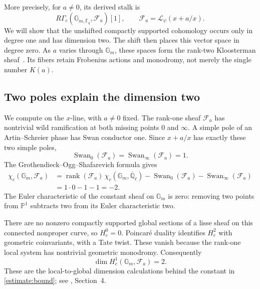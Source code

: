 \documentclass[11pt]{article}
\theoremstyle{remark}
\begin{document}
More precisely, for \(a\ne0\), its derived stalk is
\begin{equation}
R\Gamma_c\!\left(\mathbb G_{m,\overline{\mathbb F}_q},
\mathcal F_a\right)[1],
\qquad
\mathcal F_a=\mathcal L_\psi(x+a/x).
\label{estimate:stalk}
\end{equation}
We will show that the unshifted compactly supported cohomology occurs only in degree one and has dimension two. The shift then places this vector space in degree zero. As \(a\) varies through \(\mathbb G_m\), these spaces form the rank-two Kloosterman sheaf~\cite{katz}. Its fibers retain Frobenius actions and monodromy, not merely the single number \(K(a)\).

\subsection{Two poles explain the dimension two}

We compute on the \(x\)-line, with \(a\ne0\) fixed. The rank-one sheaf \(\mathcal F_a\) has nontrivial wild ramification at both missing points \(0\) and \(\infty\). A simple pole of an Artin--Schreier phase has Swan conductor one. Since \(x+a/x\) has exactly these two simple poles,
\[
\operatorname{Swan}_0(\mathcal F_a)
=\operatorname{Swan}_\infty(\mathcal F_a)=1.
\]
The Grothendieck--Ogg--Shafarevich formula gives
\begin{align*}
\chi_c(\mathbb G_m,\mathcal F_a)
&=\operatorname{rank}(\mathcal F_a)\,
\chi_c(\mathbb G_m,\overline{\mathbb Q}_\ell)
-\operatorname{Swan}_0(\mathcal F_a)
-\operatorname{Swan}_\infty(\mathcal F_a)\\
&=1\cdot0-1-1=-2.
\end{align*}
The Euler characteristic of the constant sheaf on \(\mathbb G_m\) is zero: removing two points from \(\mathbb P^1\) subtracts two from its Euler characteristic two.

There are no nonzero compactly supported global sections of a lisse sheaf on this connected nonproper curve, so \(H_c^0=0\). Poincar\'e duality identifies \(H_c^2\) with geometric coinvariants, with a Tate twist. These vanish because the rank-one local system has nontrivial geometric monodromy. Consequently
\begin{equation}
\dim H_c^1(\mathbb G_m,\mathcal F_a)=2.
\label{estimate:rank-two}
\end{equation}
These are the local-to-global dimension calculations behind the constant in \eqref{estimate:bound}; see \cite{michel-applied}, Section~4.
\end{document}
